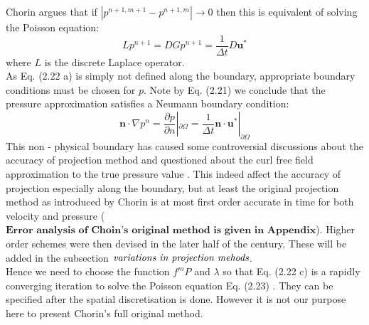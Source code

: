 Chorin argues that if $|\textit{p}^{n+1, m+1} - \textit{p}^{n+1, m}| \rightarrow 0$ then this is equivalent of solving the Poisson equation:
\begin{equation}
L\textit{p}^{n+1} = DG\textit{p}^{n+1} = \dfrac{1}{\Delta t} D \textbf{u}^*
\end{equation}
where $\textit{L}$ is the discrete Laplace operator.\\
As Eq. (2.22 a) is simply not defined along the boundary, appropriate boundary conditions must be chosen for $\textit{p}$. Note by Eq. (2.21) we conclude that the pressure approximation satisfies a Neumann boundary condition:
\begin{equation*}
\textbf{n} \cdot \nabla \textit{p}^n = \dfrac{\partial p}{\partial n} |_{\partial \Omega} = \dfrac{1}{\Delta t} \textbf{n} \cdot \textbf{u}^* |_{\partial \Omega}
\end{equation*}
This non - physical boundary has caused some controversial discussions about the accuracy of projection method and questioned about the curl free field approximation to the true pressure value \cite{rannacher1992chorin,shen1992error}. This indeed affect the accuracy of projection especially along the boundary, but at least the original projection method as introduced by Chorin is at most first order accurate in time for both velocity and pressure \cite{brown2001accurate,shen1992error,rannacher1992chorin} ($\textbf{Error analysis of Choin's original method is given in Appendix}$). Higher order schemes were then devised in the later half of the century, These will be added in the subsection $\emph{variations in projection mehods}$.\\

Hence we need to choose the function $f^m \textit{P}$ and $\lambda$ so that Eq. (2.22 c) is a rapidly converging iteration to solve the Poisson equation Eq. (2.23) \cite{chorin1968numerical}. They can be specified after the spatial discretisation is done. However it is not our purpose here to present Chorin's full original method.\\


